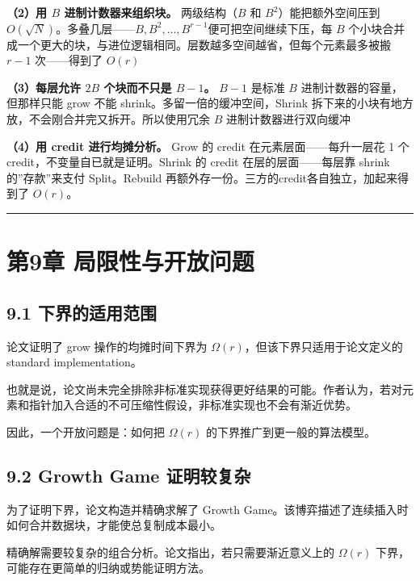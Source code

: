 \documentclass[
  UTF8,
  a4paper,
  12pt]{ctexart}
\begin{document}
\textbf{（2）用 \(B\) 进制计数器来组织块。} 两级结构（\(B\) 和
\(B^2\)）能把额外空间压到
\(O(\sqrt{N})\)。多叠几层------\(B, B^2, \dots, B^{r-1}\)便可把空间继续下压，每
\(B\)
个小块合并成一个更大的块，与进位逻辑相同。层数越多空间越省，但每个元素最多被搬
\(r-1\) 次------得到了 \(O(r)\)

\textbf{（3）每层允许 \(2B\) 个块而不只是 \(B-1\)。} \(B-1\) 是标准
\(B\) 进制计数器的容量，但那样只能 grow 不能
shrink。多留一倍的缓冲空间，Shrink
拆下来的小块有地方放，不会刚合并完又拆开。所以使用冗余 \(B\)
进制计数器进行双向缓冲

\textbf{（4）用 credit 进行均摊分析。} Grow 的 credit
在元素层面------每升一层花 1 个 credit，不变量自已就是证明。Shrink 的
credit 在层的层面------每层靠 shrink 的''存款''来支付 Split。Rebuild
再额外存一份。三方的credit各自独立，加起来得到了 \(O(r)\)。

\begin{center}\rule{0.5\linewidth}{0.5pt}\end{center}

\section{第9章
局限性与开放问题}\label{ux7b2c9ux7ae0-ux5c40ux9650ux6027ux4e0eux5f00ux653eux95eeux9898}

\subsection{9.1
下界的适用范围}\label{ux4e0bux754cux7684ux9002ux7528ux8303ux56f4}

论文证明了 grow 操作的均摊时间下界为
\(\Omega(r)\)，但该下界只适用于论文定义的 standard implementation。

也就是说，论文尚未完全排除非标准实现获得更好结果的可能。作者认为，若对元素和指针加入合适的不可压缩性假设，非标准实现也不会有渐近优势。

因此，一个开放问题是：如何把 \(\Omega(r)\)
的下界推广到更一般的算法模型。

\subsection{9.2 Growth Game
证明较复杂}\label{growth-game-ux8bc1ux660eux8f83ux590dux6742}

为了证明下界，论文构造并精确求解了 Growth
Game。该博弈描述了连续插入时如何合并数据块，才能使总复制成本最小。

精确解需要较复杂的组合分析。论文指出，若只需要渐近意义上的 \(\Omega(r)\)
下界，可能存在更简单的归纳或势能证明方法。
\end{document}

